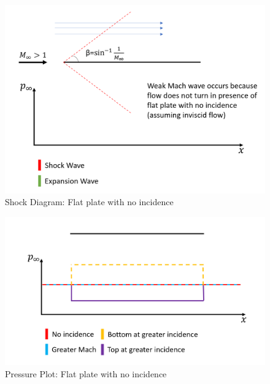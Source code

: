 \documentclass[../main.tex]{subfiles}
\begin{document}
\newpage

\begin{figure}[h!]
    \centering
    \includegraphics[scale=0.5]{../../images/problem_2/fig_11.png}
    \caption{Shock Diagram: Flat plate with no incidence}
    \label{flat_shock}
\end{figure}

\begin{figure}[h!]
    \centering
    \includegraphics[scale=0.5]{../../images/problem_2/fig_12.png}
    \caption{Pressure Plot: Flat plate with no incidence}
    \label{flat_pressure}
\end{figure}
\end{document}
